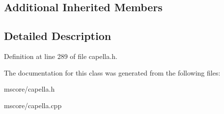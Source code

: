 \subsection*{Additional Inherited Members}


\subsection{Detailed Description}


Definition at line 289 of file capella.\+h.



The documentation for this class was generated from the following files\+:\begin{DoxyCompactItemize}
\item 
mscore/capella.\+h\item 
mscore/capella.\+cpp\end{DoxyCompactItemize}
